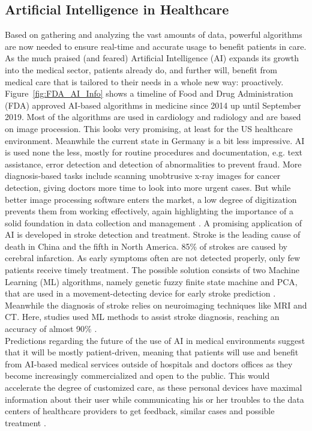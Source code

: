 \subsection{Artificial Intelligence in Healthcare}
\label{sec:AIinHC}
Based on gathering and analyzing the vast amounts of data, powerful algorithms are now needed to ensure real-time and accurate usage to benefit patients in care. As the much praised (and feared) Artificial Intelligence (AI) expands its growth into the medical sector, patients already do, and further will, benefit from medical care that is tailored to their needs in a whole new way: proactively. Figure~\ref{fig:FDA_AI_Info} shows a timeline of Food and Drug Administration (FDA) approved AI-based algorithms in medicine since 2014 up until September 2019. Most of the algorithms are used in cardiology and radiology and are based on image procession.
This looks very promising, at least for the US healthcare environment. Meanwhile the current state in Germany is a bit less impressive. AI is used none the less, mostly for routine procedures and documentation, e.g. text assistance, error detection and detection of abnormalities to prevent fraud. More diagnosis-based tasks include scanning unobtrusive x-ray images for cancer detection, giving doctors more time to look into more urgent cases. But while better image processing software enters the market, a low degree of digitization prevents them from working effectively, again highlighting the importance of a solid foundation in data collection and management \cite{kiKroenung}. A promising application of AI is developed in stroke detection and treatment. Stroke is the leading cause of death in China and the fifth in North America. 85\% of strokes are caused by cerebral infarction. As early symptoms often are not detected properly, only few patients receive timely treatment. The possible solution consists of two Machine Learning (ML) algorithms, namely genetic fuzzy finite state machine and PCA, that are used in a movement-detecting device for early stroke prediction \cite{villar2015improving}. Meanwhile the diagnosis of stroke relies on neuroimaging techniques like MRI and CT. Here, studies used ML methods to assist stroke diagnosis, reaching an accuracy of almost 90\% \cite{rehme2014identifying}. \\
Predictions regarding the future of the use of AI in medical environments suggest that it will be mostly patient-driven, meaning that patients will use and benefit from AI-based medical services outside of hospitals and doctors offices as they become increasingly commercialized and open to the public. This would accelerate the degree of customized care, as these personal devices have maximal information about their user while communicating his or her troubles to the data centers of healthcare providers to get feedback, similar cases and possible treatment \cite{kiKroenung}.
